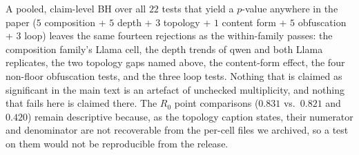 \documentclass[sigconf,anonymous]{aamas}
\begin{document}
A pooled, claim-level BH over all $22$ tests that yield a $p$-value anywhere in
the paper ($5$ composition + $5$ depth + $3$ topology + $1$ content form +
$5$ obfuscation + $3$ loop) leaves the same fourteen rejections as the
within-family passes: the composition family's Llama cell, the depth trends of
qwen and both Llama replicates, the two topology gaps named above, the
content-form effect, the four non-floor obfuscation tests, and the three loop
tests. Nothing that is claimed as significant in the main text is an artefact of
unchecked multiplicity, and nothing that fails here is claimed there. The $R_0$
point comparisons ($0.831$ vs.\ $0.821$ and $0.420$) remain descriptive because, as
the topology caption states, their numerator and denominator are not recoverable
from the per-cell files we archived, so a test on them would not be reproducible
from the release.
\end{document}
